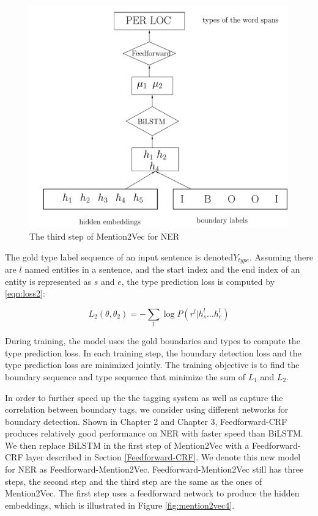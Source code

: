 \documentclass{sfuthesis}
\begin{document}
\begin{figure}
  \centering
  \includegraphics[scale=0.6]{mention2vec3.pdf}
 \caption{The third step of Mention2Vec for NER}
  \label{fig:mention2vec3}
\end{figure}

The gold type label sequence of an input sentence is denoted$Y_{type}$. Assuming there are $l$ named entities in a sentence, and the start index and the end index of an entity is represented as $s$ and $e$, the type prediction loss is computed by \ref{eqn:loss2}:

\begin{equation}\label{eqn:loss2}
  L_{2}\left( \theta ,\theta _{2}\right) =-\sum _{l}\log P\left( r^{l}|h_{s}^{l}{\ldots }h_{e}^{l}\right)
\end{equation}

During training, the model uses the gold boundaries and types to compute the type prediction loss. In each training step, the boundary detection loss and the type prediction loss are minimized jointly. The training objective is to find the boundary sequence and type sequence that minimize the sum of $L_{1}$ and $L_{2}$.


In order to further speed up the the tagging system as well as capture the correlation between boundary tags, we consider using different networks for boundary detection. Shown in Chapter 2 and Chapter 3, Feedforward-CRF produces relatively good performance on NER with faster speed than BiLSTM. We then replace BiLSTM in the first step of Mention2Vec with a Feedforward-CRF layer described in Section \ref{Feedforward-CRF}. We denote this new model for NER as Feedforward-Mention2Vec. Feedforward-Mention2Vec still has three steps, the second step and the third step are the same as the ones of Mention2Vec. The first step uses a feedforward network to produce the hidden embeddings, which is illustrated in Figure \ref{fig:mention2vec4}.
\end{document}

